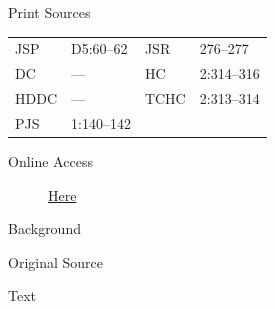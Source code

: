 			\begin{description}
				\item[Print Sources]
			\end{description}

				\begin{tabular}{p{0.5in}p{1in}p{0.5in}p{1in}}
				JSP	 	& D5:60--62		& JSR 		& 276--277 \\
				DC	 	& --- 			& HC 		& 2:314--316 \\
				HDDC 	& ---			& TCHC 		& 2:313--314 \\
				PJS 	& 1:140--142			& 	 		&  \\
				\end{tabular}
			
			\begin{description}
				\item[Online Access] \href{https://www.josephsmithpapers.org/paper-summary/letter-and-revelation-to-harvey-whitlock-16-november-1835/1}{Here}
			\end{description}
			
			\begin{description}
				\item[Background]
			\end{description}
			
			
			\begin{description}
				\item[Original Source]
			\end{description}
			
			
			\begin{description}
				\item[Text]
			\end{description}
			
